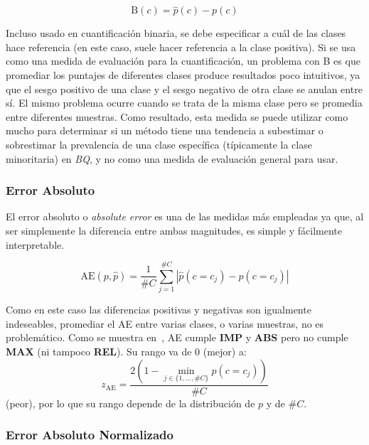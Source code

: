 \begin{equation}
    {\text{B}(c)} = \hat p(c) - p(c)\label{evaluacion:eq_b}
\end{equation}

Incluso usado en cuantificación binaria, se debe especificar a cuál de las
clases hace referencia (en este caso, suele hacer referencia a la clase
positiva). Si se usa como una medida de evaluación para la cuantificación, un
problema con B es que promediar los puntajes de diferentes clases produce
resultados poco intuitivos, ya que el sesgo positivo de una clase y el sesgo
negativo de otra clase se anulan entre sí. El mismo problema ocurre cuando se
trata de la misma clase pero se promedia entre diferentes muestras. Como
resultado, esta medida se puede utilizar como mucho para determinar si un método
tiene una tendencia a subestimar o sobrestimar la prevalencia de una clase
específica (típicamente la clase minoritaria) en {\it BQ}, y no como una medida
de evaluación general para usar.

\subsubsection{Error Absoluto}\label{evaluacion:ae}

El error absoluto o {\it absolute error\/} es una de las medidas más empleadas
ya que, al ser simplemente la diferencia entre ambas magnitudes, es simple y
fácilmente interpretable.

\begin{equation}
    {\text{AE}(p, \hat p)} = \frac{1}{\#C}\sum \limits_{j=1}^{\#C}{|\hat p(c=c_j) - p(c=c_j)|}\label{evaluacion:eq_ae}
\end{equation}

Como en este caso las diferencias positivas y negativas son igualmente
indeseables, promediar el AE entre varias clases, o varias muestras, no es
problemático. Como se muestra en~\cite{sebastiani2020evaluation}, AE cumple {\bf
IMP} y {\bf ABS} pero no cumple {\bf MAX} (ni tampoco {\bf REL}). Su rango va de
0 (mejor) a:
\begin{equation}
    z_{\text{AE}} = \frac{2(1-\displaystyle \min_{j\in\{1,\dots,\#C\}}p(c=c_j))}{\#C}\label{evaluacion:eq_zae}
\end{equation}
(peor), por lo que su rango depende de la distribución de $p$ y de $\#C$.

\subsubsection{Error Absoluto Normalizado}\label{evaluacion:nae}

